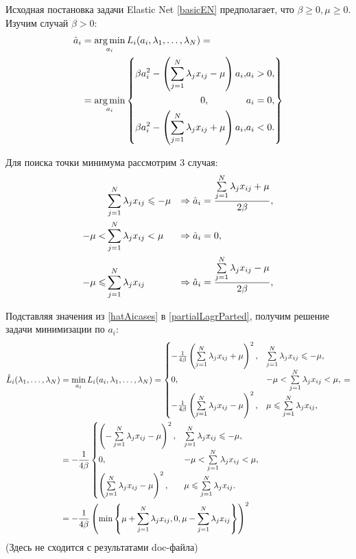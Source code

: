 Исходная постановка задачи Elastic Net \ref{basicEN} предполагает, что $\beta\ge0, \mu\ge0.$ Изучим случай $\beta > 0:$ 
\begin{equation}
	\label{hatAi}
	\begin{split}
		\hat a_i &= \mathop{\mbox{arg\ \!min}}\limits_{a_i} L_i(a_i,\lambda_{1},\ldots,\lambda_{N}) = \\
				 &=	\mathop{\mbox{arg\ \!min}}\limits_{a_i} \left\{
				 	\begin{aligned}
						\beta a_i^2 - \left(\sum\limits_{j=1}^N\lambda_jx_{ij}-\mu\right)a_i, &a_i > 0,\\
						0, \qquad\qquad &a_i = 0,\\
						\beta a_i^2 - \left(\sum\limits_{j=1}^N\lambda_jx_{ij}+\mu\right)a_i, &a_i < 0.\\
					\end{aligned}	
					\right\}
	\end{split}
\end{equation}

Для поиска точки минимума рассмотрим 3 случая:
\begin{align}
	\label{hatAicases}
	         &\sum\limits_{j=1}^N\lambda_jx_{ij} \leqslant -\mu 	&\Rightarrow \hat a_i &= \frac{\sum\limits_{j=1}^N\lambda_jx_{ij}+\mu}{2\beta}, \\
	-\mu <   &\sum\limits_{j=1}^N\lambda_jx_{ij} < \mu 	&\Rightarrow \hat a_i &= 0, \\
	-\mu \leqslant &\sum\limits_{j=1}^N\lambda_jx_{ij} 			&\Rightarrow \hat a_i &= \frac{\sum\limits_{j=1}^N\lambda_jx_{ij}-\mu}{2\beta},
\end{align}


Подставляя значения из \ref{hatAicases} в \ref{partialLagrParted}, получим решение задачи минимизации по $a_i$:
\begin{align}
	\begin{split}
		\hat L_i(\lambda_{1},\ldots,\lambda_{N}) &= \mathop{\mbox{min}}\limits_{a_i}L_i(a_i, \lambda_{1},\ldots,\lambda_{N}) =
		\begin{cases}
			-\frac1{4\beta}\left(\sum\limits_{j=1}^N\lambda_jx_{ij}+\mu\right)^2, &\sum\limits_{j=1}^N\lambda_jx_{ij} \leqslant -\mu,\\
			0, 										&-\mu < \sum\limits_{j=1}^N\lambda_jx_{ij} < \mu,\\
			-\frac1{4\beta}\left(\sum\limits_{j=1}^N\lambda_jx_{ij}-\mu\right)^2, &\mu\leqslant\sum\limits_{j=1}^N\lambda_jx_{ij},
		\end{cases} = \\
		&= -\frac1{4\beta}
		\begin{cases}
			\left(-\sum\limits_{j=1}^N\lambda_jx_{ij}-\mu\right)^2, &\sum\limits_{j=1}^N\lambda_jx_{ij} \leqslant -\mu,\\
			0, 	 					&-\mu < \sum\limits_{j=1}^N\lambda_jx_{ij} < \mu,\\
			\left(\sum\limits_{j=1}^N\lambda_jx_{ij}-\mu\right)^2, &\mu\leqslant\sum\limits_{j=1}^N\lambda_jx_{ij}.
		\end{cases} 	\\
		&= -\frac1{4\beta} \left(\mathop{\mbox{min}}\limits\left\{\mu + \sum\limits_{j=1}^N\lambda_jx_{ij}, 0, \mu-\sum\limits_{j=1}^N\lambda_jx_{ij}\right\}\right)^2
	\end{split}
\end{align}
(Здесь не сходится с результатами doc-файла)

